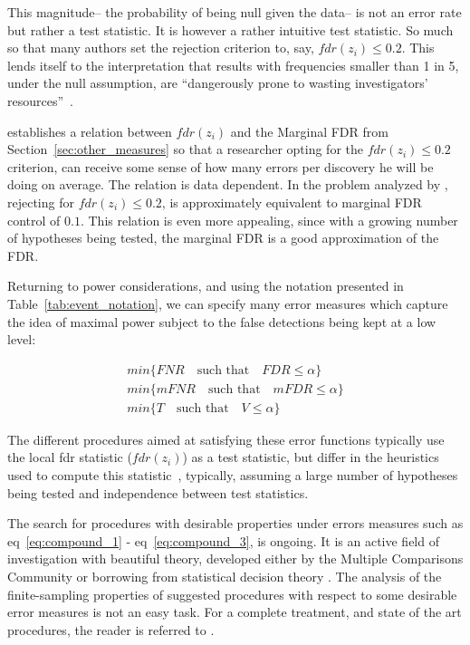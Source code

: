 \documentclass[review,12pt]{article}
\theoremstyle{definition}
\begin{document}
This magnitude-- the probability of being null given the data-- is not an error rate but rather a test statistic. It is however a rather intuitive test statistic. So much so that many authors set the rejection criterion to, say, $fdr(z_i)\leq 0.2$. This lends itself to the interpretation that results with frequencies smaller than 1 in 5, under the null assumption, are ``dangerously prone to wasting investigators' resources''~\cite{efron_microarrays_2008}. 

\citet{storey_positive_2003} establishes a relation between $fdr(z_i)$ and the Marginal FDR from Section~\ref{sec:other_measures} so that a researcher opting for the $fdr(z_i)\leq 0.2$ criterion, can receive some sense of how many errors per discovery he will be doing on average.  The relation is data dependent. In the problem analyzed by \citet{efron_microarrays_2008}, rejecting for $fdr(z_i)\leq 0.2$, is approximately equivalent to marginal FDR control of $0.1$.
This relation is even more appealing, since with a growing number of hypotheses being tested, the marginal FDR is a good approximation of the FDR. 

Returning to power considerations, and using the notation presented in Table~\ref{tab:event_notation}, we can specify many error measures which capture the idea of maximal power subject to the false detections being kept at a low level:

\begin{align}
        min\{FNR \quad \text{such that} \quad FDR\leq \alpha \} \label{eq:compound_1}\\
	min\{mFNR \quad \text{such that} \quad mFDR\leq \alpha \} \label{eq:compound_2}\\
	min\{T \quad \text{such that} \quad V \leq \alpha \} \label{eq:compound_3}
\end{align}


The different procedures aimed at satisfying these error functions typically use the local fdr statistic ($fdr(z_i)$) as a test statistic, but differ in the heuristics used to  compute this statistic~\cite[eg.][]{storey_direct_2002,efron_microarrays_2008,sun_oracle_2007}, typically, assuming a large number of hypotheses being tested and independence between test statistics. 

The search for procedures with desirable properties under errors measures such as eq~\ref{eq:compound_1}  - eq~\ref{eq:compound_3}, is ongoing. It is an active field of investigation with beautiful theory, developed either by the Multiple Comparisons Community or borrowing from statistical decision theory \cite[see][]{sun_oracle_2007}. The analysis of the finite-sampling properties of suggested procedures with respect to some desirable error measures is not an easy task.  For a complete treatment, and state of the art procedures, the reader is referred to \cite{efron_large-scale_2010}.
\end{document}
